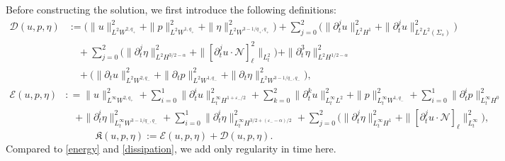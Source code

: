 \documentclass[letterpaper,reqno,10pt,twoside]{amsart}
\theoremstyle{definition}
\theoremstyle{remark}
\def\p{\partial}
\begin{document}
	Before constructing the solution, we first introduce the following definitions: 
	\begin{equation}\label{def:dissipation}
		\begin{aligned}
			\mathscr{D}(u,p,\eta)&:=\Big(\|u\|_{L^{2}W^{2,q_{+}}}^2+\|p\|_{L^{2}W^{1,q_{+}}}^{2}+\|\eta\|_{L^{2}W^{3-1/q_+, q_+}}^2\Big)+\sum_{j=0}^2\Big(\|\p_t^ju\|_{L^{2}H^{1}}^2+\|\p_t^ju\|_{L^{2}L^2(\Sigma_s)}^2\Big)\\&\quad
			+\sum_{j=0}^2\Big(\|\p_t^j\eta\|_{L^{2}H^{3/2-\alpha}}^2+\|[\p_t^{j}u\cdot \mathcal{N}]_\ell^2\|_{L_{t}^{2}}\Big)+\|\p_t^3\eta\|_{L^{2}H^{1/2-\alpha}}^2\\
			&\quad+\Big(\|\p_tu\|_{L^{2}W^{2,q_{-}}}^2+\|\p_{t}p\|_{L^{2}W^{1,q_{-}}}^{2}+\|\p_{t}\eta\|_{L^{2}W^{3-1/q_-, q_-}}^2\Big),
		\end{aligned}
	\end{equation}
	\begin{equation}\label{def:energy}
		\begin{aligned}
			\mathscr{E}(u,p,\eta)&: =\|u\|_{L^{\infty}W^{2,q_+}}^2+\sum_{i=0}^{1}\|\p_t^{i}u\|_{L_{t}^{\infty}H^{1+\varepsilon_-/2}}^2+\sum_{k=0}^2\|\p_t^ku\|_{L_{t}^{\infty}L^{2}}^2+\|p\|_{L_{t}^{\infty}W^{1,q_-}}^2+\sum_{i=0}^{1}\|\p_t^{i}p\|_{L_{t}^{\infty}H^{0}}^2\\&\quad+\|\p_{t}^{i}\eta\|_{L_{t}^{\infty}W^{3-1/q_-, q_-}}^2+\sum_{i=0}^{1}\|\p_t^{i}\eta\|_{L_{t}^{\infty}H^{3/2+(\varepsilon_--\alpha)/2}}^2+\sum_{j=0}^2\Big(\|\p_t^j\eta\|_{L_{t}^{\infty}H^{1}}^2+\|[\p_{t}^{j}u\cdot \mathcal{N}]_{\ell}\|_{L_{t}^{\infty}}^{2}\Big),
		\end{aligned}
	\end{equation}
	\begin{equation}\label{def:DEK_0}
		\mathfrak{K}(u,p,\eta):=\mathscr{E}(u,p,\eta)+\mathscr{D}(u,p,\eta).
	\end{equation}
	\noindent Compared to \eqref{energy} and \eqref{dissipation}, we add only regularity in time here.
	
\end{document}

